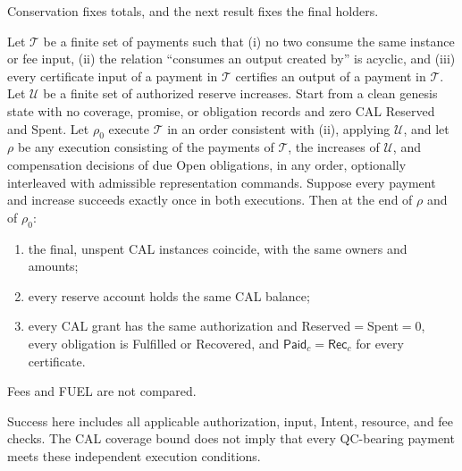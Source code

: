 Conservation fixes totals, and the next result fixes the final holders.

\begin{theorem}
\label{thm:security-neutrality}
Let $\mathcal T$ be a finite set of payments such that (i) no two consume
the same instance or fee input, (ii) the relation ``consumes an output
created by'' is acyclic, and (iii) every certificate input of a payment in
$\mathcal T$ certifies an output of a payment in $\mathcal T$. Let
$\mathcal U$ be a finite set of authorized reserve increases. Start from a
clean genesis state with no coverage, promise, or obligation records and
zero CAL Reserved and Spent. Let $\rho_0$ execute $\mathcal T$ in an order
consistent with (ii), applying $\mathcal U$, and let $\rho$ be any
execution consisting of the payments of $\mathcal T$, the increases of
$\mathcal U$, and compensation decisions of due Open obligations, in any
order, optionally interleaved with admissible representation commands.
Suppose every payment and increase succeeds exactly once in both
executions. Then at the end of $\rho$ and of $\rho_0$:
\begin{enumerate}
\item the final, unspent CAL instances coincide, with the same owners and
amounts;
\item every reserve account holds the same CAL balance;
\item every CAL grant has the same authorization and
Reserved$=$Spent$=0$, every obligation is Fulfilled or Recovered, and
$\mathsf{Paid}_c=\mathsf{Rec}_c$ for every certificate.
\end{enumerate}
Fees and FUEL are not compared.
\end{theorem}
Success here includes all applicable authorization, input, Intent,
resource, and fee checks. The CAL coverage bound does not imply that
every QC-bearing payment meets these independent execution conditions.

